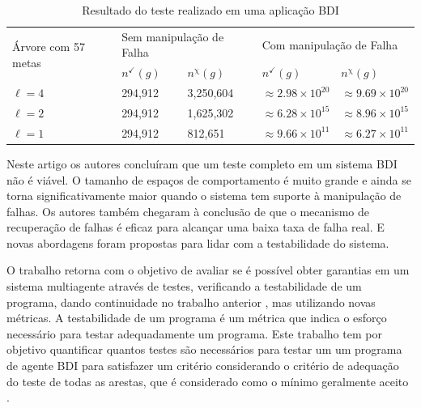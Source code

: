 \begin{table}[ht]
\centering
\caption{Resultado do teste realizado em uma aplicação BDI \cite{winikoff2014testability}}
\label{tab:result_ontestability}
\begin{tabular}{@{}lllll@{}}
\toprule
\multirow{2}{*}{Árvore com 57 metas} & \multicolumn{2}{l}{Sem manipulação de Falha} & \multicolumn{2}{l}{Com manipulação de Falha}                  \\
                                        & $n^{\checkmark}(g)$     & $n^{\upchi}(g)$    & $n^{\checkmark}(g)$           & $n^{\upchi}(g)$               \\ \midrule
$\ell = 4$                              & 294,912                 & 3,250,604          & $\approx 2.98 \times 10^{20}$ & $\approx 9.69 \times 10^{20}$ \\
$\ell = 2$                              & 294,912                 & 1,625,302          & $\approx 6.28 \times 10^{15}$ & $\approx 8.96 \times 10^{15}$ \\
$\ell = 1$                              & 294,912                 & 812,651            & $\approx 9.66 \times 10^{11}$ & $\approx 6.27 \times 10^{11}$ \\ \bottomrule
\end{tabular}
\end{table}

Neste artigo os autores concluíram que um teste completo em um sistema BDI não é viável. O tamanho de espaços de comportamento é muito grande e ainda se torna significativamente maior quando o sistema tem suporte à manipulação de falhas. Os autores também chegaram à conclusão de que o mecanismo de recuperação de falhas é eficaz para alcançar uma baixa taxa de falha real. E novas abordagens foram propostas para lidar com a testabilidade do sistema.


O trabalho \cite{winikoff2017bdi} retorna com o objetivo de avaliar se é possível obter garantias em um sistema multiagente através de testes, verificando a testabilidade de um programa, dando continuidade no trabalho anterior \cite{winikoff2014testability}, mas utilizando novas métricas. A testabilidade de um programa é um métrica que indica o esforço necessário para testar adequadamente um programa. Este trabalho tem por objetivo quantificar quantos testes são necessários para testar um um programa de agente BDI para satisfazer um critério considerando o critério de adequação do teste de todas as arestas, que é considerado como o mínimo geralmente aceito \cite{jorgensen2016software}. 

